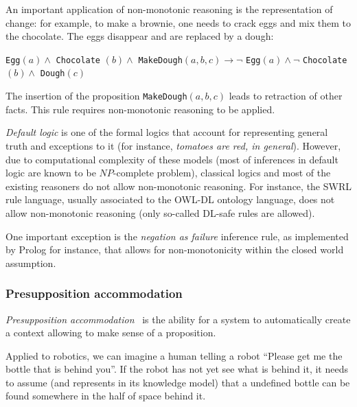 \documentclass[a4paper, twocolumn]{article}
\newcommand{\concept}[1]{{\footnotesize \texttt{#1}}}
\begin{document}
An important application of non-monotonic reasoning is the representation of
change: for example, to make a brownie, one needs to crack eggs and mix them to the chocolate.
The eggs disappear and are replaced by a dough:

\concept{Egg}$(a) \land $ \concept{Chocolate} $(b) \land $
\concept{MakeDough}$(a, b, c) \to \lnot $ \concept{Egg}$(a) \land \lnot $
\concept{Chocolate}$(b) \land $ \concept{Dough}$(c)$

The insertion of the proposition \concept{MakeDough}$(a, b, c)$ leads to
retraction of other facts. This rule requires non-monotonic reasoning to be
applied.

\emph{Default logic} is one of the formal logics that account for representing
general truth and exceptions to it (for instance, \emph{tomatoes are red, in
general}). However, due to computational complexity of these models (most of
inferences in default logic are known to be $NP$-complete problem), classical
logics and most of the existing reasoners do not allow non-monotonic reasoning.
For instance, the SWRL rule language, usually associated to the OWL-DL ontology
language, does not allow non-monotonic reasoning (only so-called DL-safe rules
are allowed).


One important exception is the \emph{negation as failure} inference rule, as
implemented by {\sc Prolog} for instance, that allows for non-monotonicity
within the closed world assumption.



\subsubsection{Presupposition accommodation}
\label{sect|presupposition-accommodation}

\emph{Presupposition accommodation}~\cite{VonFintel2008} is the ability for a
system to automatically create a context allowing to make sense of a
proposition.

Applied to robotics, we can imagine a human telling a robot ``Please get me the
bottle that is behind you''. If the robot has not yet see what is behind it, it
needs to assume (and represents in its knowledge model) that a undefined bottle
can be found somewhere in the half of space behind it.
\end{document}
